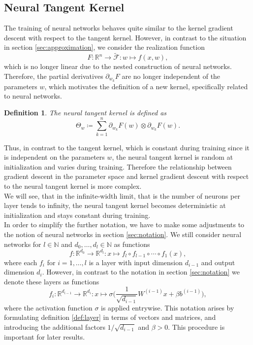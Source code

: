 \documentclass[11pt, a4paper]{article}
\newtheorem{definition}[theorem]{Definition}
\newcommand{\N}{\mathbb{N}}
\newcommand{\R}{\mathbb{R}}
\newcommand{\F}{\mathcal{F}}
\begin{document}
\subsection{Neural Tangent Kernel}

The training of neural networks behaves quite similar to the kernel gradient descent with respect to the tangent kernel. However, in contrast to the situation in section \ref{sec:approximation}, we consider the realization function
\[ F: \R^n \to \tilde{\F} : w \mapsto f(x,w), \]
 which is no longer linear due to the nested construction of neural networks. Therefore, the partial derivatives $\partial_{w_k}F$ are no longer independent of the parameters $w$, which motivates the definition of a new kernel, specifically related to neural networks.

\begin{definition} \label{def:ntk}
The neural tangent kernel is defined as
\[ \Theta_w \coloneq \sum_{k=1}^{n} \partial_{w_k} F(w) \otimes \partial_{w_k} F(w). \]
\end{definition}

Thus, in contrast to the tangent kernel, which is constant during training since it is independent on the parameters $w$, the neural tangent kernel is random at initialization and varies during training. Therefore the relationship between gradient descent in the parameter space and kernel gradient descent with respect to the neural tangent kernel is more complex. \\

We will see, that in the infinite-width limit, that is the number of neurons per layer tends to infinity, the neural tangent kernel becomes deterministic at initialization and stays constant during training. \\

In order to simplify the further notation, we have to make some adjustments to the notion of neural networks in section \ref{sec:notation}. We still consider neural networks for $l \in \N$ and $d_0, \dots, d_l \in \N$ as functions
\[ f: \R^{d_0} \to \R^{d_l} : x \mapsto f_l \circ f_{l-1} \circ \cdots \circ f_1(x), \]
where each $f_i$ for $i=1, \dots, l$ is a layer with input dimension $d_{i-1}$ and output dimension $d_i$. However, in contrast to the notation in section \ref{sec:notation} we denote these layers as functions 
\[ f_{i} : \R^{d_{i-1}} \to \R^{d_i} : x \mapsto \sigma \Big ( \frac{1}{\sqrt{d_{i-1}}} W^{(i-1)}x + \beta b^{(i-1)} \Big ), \]
where the activation function $\sigma$ is applied entrywise. This notation arises by formulating definition \ref{def:layer} in terms of vectors and matrices, and introducing the additional factors $1/\sqrt{d_{i-1}}$ and $\beta > 0$. This procedure is important for later results.
\end{document}
